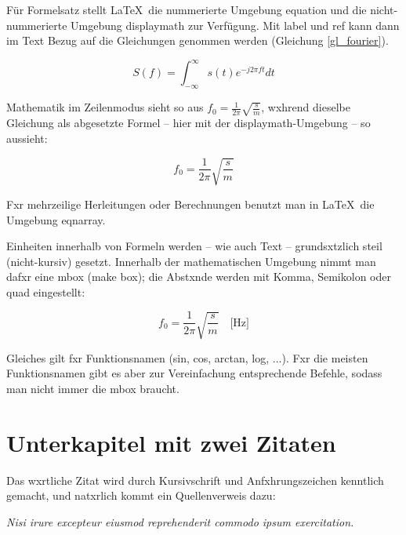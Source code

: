             Für Formelsatz stellt \LaTeX\ die nummerierte Umgebung equation und die nicht-nummerierte Umgebung displaymath zur Verfügung. Mit label und ref kann dann im Text Bezug auf die Gleichungen genommen werden (Gleichung \ref{gl_fourier}). 

            \begin{equation}\label{gl_fourier}
            S(f) = \int_{-\infty}^{\infty} s(t)e^{-j 2 \pi f t}dt
            \end{equation}

            Mathematik im Zeilenmodus sieht so aus $f_0 = \frac{1}{2\pi} \sqrt{\frac{s}{m}}$, wxhrend dieselbe Gleichung als abgesetzte Formel -- hier mit der displaymath-Umgebung -- so aussieht: 

            \begin{displaymath}
            f_0 = \frac{1}{2\pi} \sqrt{\frac{s}{m}} 
            \end{displaymath}

            Fxr mehrzeilige Herleitungen oder Berechnungen benutzt man in \LaTeX\ die Umgebung eqnarray.

            Einheiten innerhalb von Formeln werden -- wie auch Text -- grundsxtzlich steil (nicht-kursiv) gesetzt. Innerhalb der mathematischen Umgebung nimmt man dafxr eine mbox (make box); die Abstxnde werden mit Komma, Semikolon oder quad eingestellt:

            \begin{displaymath}
            f_0 = \frac{1}{2\pi} \sqrt{\frac{s}{m}} \quad \mbox{[Hz]}
            \end{displaymath}

            Gleiches gilt fxr Funktionsnamen (sin, cos, arctan, log, ...). Fxr die meisten Funktionsnamen gibt es aber zur Vereinfachung entsprechende Befehle, sodass man nicht immer die mbox braucht.


        \section{Unterkapitel mit zwei Zitaten}

            Das wxrtliche Zitat wird durch Kursivschrift und Anfxhrungszeichen kenntlich gemacht, und natxrlich kommt ein Quellenverweis dazu:

            \medskip
            \emph{Nisi irure excepteur eiusmod reprehenderit commodo ipsum exercitation.}
            \medskip

